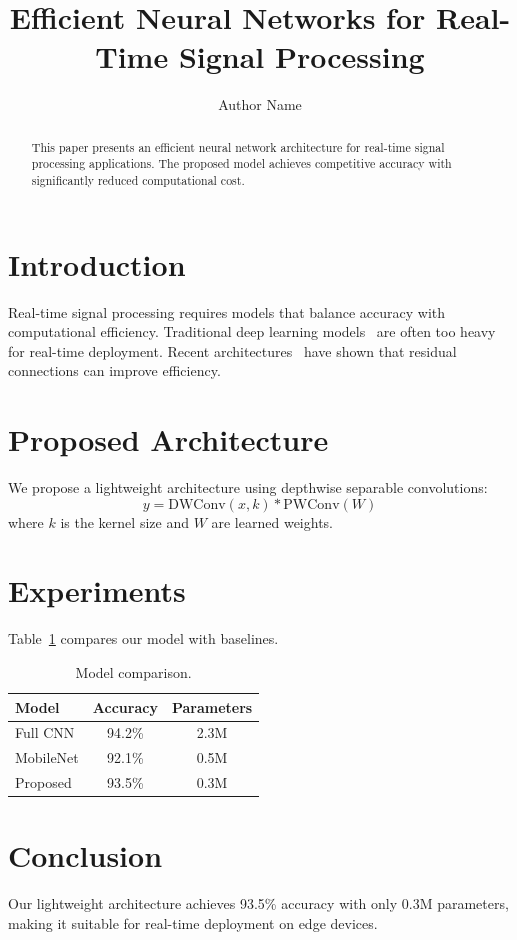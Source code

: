\documentclass{llncs}
\begin{document}
\title{Efficient Neural Networks for Real-Time Signal Processing}
\author{Author Name}

\maketitle

\begin{abstract}
This paper presents an efficient neural network architecture
for real-time signal processing applications. The proposed
model achieves competitive accuracy with significantly
reduced computational cost.

\end{abstract}

\section{Introduction}
Real-time signal processing requires models that balance
accuracy with computational efficiency. Traditional deep
learning models~\cite{hochreiter1997} are often too heavy
for real-time deployment. Recent architectures~\cite{he2016}
have shown that residual connections can improve efficiency.

\section{Proposed Architecture}
We propose a lightweight architecture using depthwise
separable convolutions:
\begin{equation}
y = \text{DWConv}(x, k) \ast \text{PWConv}(W)
\end{equation}
where $k$ is the kernel size and $W$ are learned weights.

\section{Experiments}
Table~\ref{tab:results} compares our model with baselines.

\begin{table}[htbp]
\caption{Model comparison.}
\label{tab:results}
\centering
\begin{tabular}{lcc}
\toprule
Model & Accuracy & Parameters \\
\midrule
Full CNN & 94.2\% & 2.3M \\
MobileNet & 92.1\% & 0.5M \\
Proposed & 93.5\% & 0.3M \\
\bottomrule
\end{tabular}
\end{table}

\section{Conclusion}
Our lightweight architecture achieves 93.5\% accuracy with
only 0.3M parameters, making it suitable for real-time
deployment on edge devices.



\end{document}
